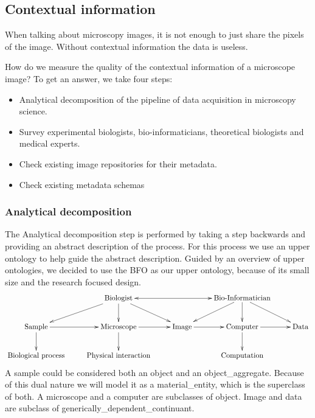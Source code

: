 \subsection{Contextual information}

When talking about microscopy images, it is
not enough to just share the pixels of the
image. Without contextual
information the data is useless.

How do we measure the quality of the contextual information of a
microscope image? To get an answer, we take four steps:
\begin{itemize}
\item Analytical decomposition of the
  pipeline of data acquisition
  in microscopy science.
\item Survey experimental biologists, bio-informaticians, theoretical
  biologists and medical experts.
\item Check existing image repositories for
  their metadata.
\item Check existing metadata schemas
\end{itemize}

\subsubsection{Analytical decomposition}

The Analytical decomposition
step is performed by taking a
step backwards and providing an abstract description of the
process. For this process we use an upper
ontology
to help guide the abstract description. Guided by an overview of upper
ontologies\cite{mascardi2007comparison}, we decided to use the
BFO\cite{grenon2004biodynamic} as our upper ontology, because of its
small size and the research focused design.
\begin{displaymath}
  \xymatrix{ & \text{Biologist} \ar[dl] \ar[d] \ar[dr] \ar@{<->}[rr] &
    & \text{Bio-Informatician} \ar[dl] \ar[d] \ar[dr] &
    \\ \text{Sample} \ar[d] \ar[r] & \text{Microscope} \ar[d] \ar[r] &
    \text{Image} \ar[r] & \text{Computer} \ar[d] \ar[r] & \text{Data}
    \\ \text{Biological process} & \text{Physical interaction} & &
    \text{Computation} & }
\end{displaymath}
A sample could be considered both an
object and an
object\_aggregate. Because of this dual nature
we will model it as a material\_entity, which
is the superclass of both. A microscope and a
computer are subclasses of
object. Image and data are
subclass of
generically\_dependent\_continuant.

